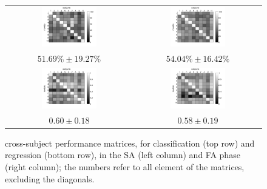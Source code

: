 \begin{figure}[!ht] \centering
  \begin{tabular}{cc}
    \includegraphics[width=0.45\textwidth]{figs/crossClass1} & \includegraphics[width=0.45\textwidth]{figs/crossClass2} \\
    $51.69\% \pm 19.27\%$ & $54.04\% \pm 16.42\%$ \\
    \includegraphics[width=0.45\textwidth]{figs/crossRegr1} & \includegraphics[width=0.45\textwidth]{figs/crossRegr2} \\
    $0.60 \pm 0.18$ & $0.58 \pm 0.19$ \\
  \end{tabular}
  \caption{cross-subject performance matrices, for classification (top
    row) and regression (bottom row), in the SA (left column)
    and FA phase (right column); the numbers refer to all element of
    the matrices, excluding the diagonals.}
  \label{fig:cross}
\end{figure}

